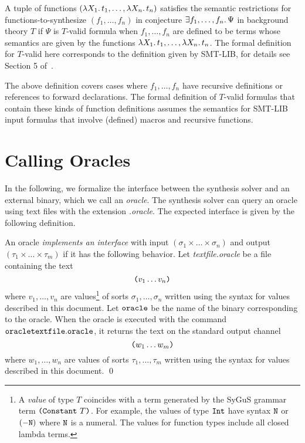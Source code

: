 \documentclass[english,a4paper,10pt]{article}
\begin{document}
A tuple of functions 
$( \lambda X_1 \ldotp t_1, \ldots, \lambda X_n \ldotp t_n)$
satisfies the semantic restrictions
for functions-to-synthesize $( f_1, \ldots, f_n )$
in conjecture $\exists f_1, \ldots, f_n \ldotp\Psi$ in background theory $T$
if $\Psi$ is $T$-valid formula
when $f_1, \ldots, f_n$ are defined to be terms
whose semantics are given by the functions
$\lambda X_1 \ldotp t_1, \ldots, \lambda X_n \ldotp t_n$.
The formal definition for $T$-valid here
corresponds to the definition given by SMT-LIB,
for details see Section 5 of~\cite{BarFT-RR-17}.

The above definition covers cases where $f_1, \ldots, f_n$
have recursive definitions or references to forward declarations.
The formal definition of $T$-valid formulas that contain these kinds of
function definitions assumes the semantics for SMT-LIB input formulas that 
involve (defined) macros and recursive functions.

\section{Calling Oracles}%
\label{sec:oracleimplementations}

In the following, we formalize the interface between the
synthesis solver and an external binary, which we call an \emph{oracle}.
The synthesis solver can query an oracle using text files with the extension
\textit{.oracle}.
The expected interface is given by the following definition.

\begin{definition}
An oracle \emph{implements an interface} with input
$(\sigma_1 \times \ldots \times \sigma_n)$ and output
$(\tau_1 \times \ldots \times \tau_m)$ if
it has the following behavior.
Let \textit{textfile.oracle}
be a file containing the text
\[
\texttt{(}v_1 \ldots v_n\texttt{)}
\]
where $v_1, \ldots, v_n$ are values\footnote{
A \emph{value} of type $T$ 
coincides with a term generated by the SyGuS grammar term
$\texttt{(}\texttt{Constant}\mbox{ }T\texttt{)}$.
For example, the values of type ${\tt Int}$
have syntax ${\tt N}$ or ${\tt (- N)}$ where ${\tt N}$ is a numeral.
The values for function types include all closed lambda terms.
} of sorts $\sigma_1, \ldots, \sigma_n$
written using the syntax for values described in this document.
Let ${\tt oracle}$ be the name of the binary corresponding to the oracle.
When the oracle is executed with the command
${\tt oracle textfile.oracle}$,
it returns the text on the standard output channel
\[
\texttt{(}w_{1} \ldots w_{m}\texttt{)}
\]
where $w_1, \ldots, w_n$ are values of sorts $\tau_1, \ldots, \tau_m$
written using the syntax for values described in this document.
\qed
\end{definition}
\end{document}
